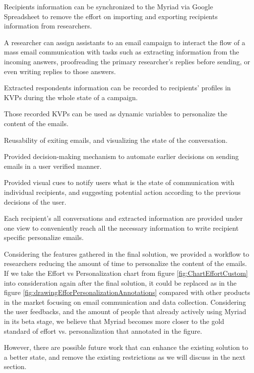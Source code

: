 \begin{compactitem}
	\item Recipients information can be synchronized to the Myriad via Google Spreadsheet to remove the effort on importing and exporting recipients information from researchers.
	\item A researcher can assign assistants to an email campaign to interact the flow of a mass email communication with tasks such as extracting information from the incoming answers, proofreading the primary researcher's replies before sending, or even writing replies to those answers.
	\item Extracted respondents information can be recorded to recipients' profiles in \ac{KVP}s during the whole state of a campaign. 
	\item Those recorded \ac{KVP}s can be used as dynamic variables to personalize the content of the emails.
	\item Reusability of exiting emails, and visualizing the state of the conversation.
	\item Provided decision-making mechanism to automate earlier decisions on sending emails in a user verified manner.
	\item Provided visual cues to notify users what is the state of communication with individual recipients, and suggesting potential action according to the previous decisions of the user.
	\item Each recipient's all conversations and extracted information are provided under one view to conveniently reach all the necessary information to write recipient specific personalize emails.
 \end{compactitem}

Considering the features gathered in the final solution, we provided a workflow to researchers reducing the amount of time to personalize the content of the emails. If we take the Effort vs Personalization chart from figure \ref{fig:ChartEffortCustom} into consideration again after the final solution, it could be replaced as in the figure \ref{fig:drawingEfforPersonalizationAnnotations} compared with other products in the market focusing on email communication and data collection. Considering the user feedbacks, and the amount of people that already actively using Myriad in its beta stage, we believe that Myriad becomes more closer to the gold standard of effort vs. personalization that annotated in the figure.
\vspace{1cm}

However, there are possible future work that can enhance the existing solution to a better state, and remove the existing restrictions as we will discuss in the next section.


